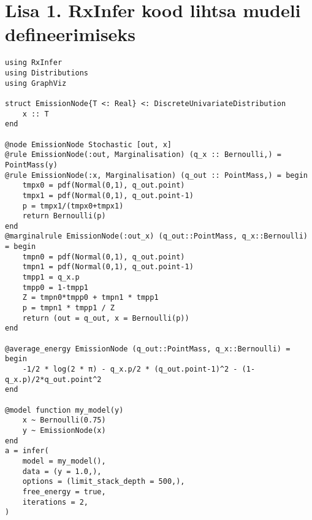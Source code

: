 \section*{Lisa 1. RxInfer kood lihtsa mudeli defineerimiseks} 
\label{section:lisa1}

\begin{verbatim}
using RxInfer
using Distributions
using GraphViz

struct EmissionNode{T <: Real} <: DiscreteUnivariateDistribution
    x :: T
end

@node EmissionNode Stochastic [out, x]
@rule EmissionNode(:out, Marginalisation) (q_x :: Bernoulli,) = PointMass(y)
@rule EmissionNode(:x, Marginalisation) (q_out :: PointMass,) = begin
    tmpx0 = pdf(Normal(0,1), q_out.point)
    tmpx1 = pdf(Normal(0,1), q_out.point-1)
    p = tmpx1/(tmpx0+tmpx1)
    return Bernoulli(p)
end
@marginalrule EmissionNode(:out_x) (q_out::PointMass, q_x::Bernoulli) = begin
    tmpn0 = pdf(Normal(0,1), q_out.point)
    tmpn1 = pdf(Normal(0,1), q_out.point-1)
    tmpp1 = q_x.p
    tmpp0 = 1-tmpp1  
    Z = tmpn0*tmpp0 + tmpn1 * tmpp1
    p = tmpn1 * tmpp1 / Z
    return (out = q_out, x = Bernoulli(p))
end

@average_energy EmissionNode (q_out::PointMass, q_x::Bernoulli) = begin
    -1/2 * log(2 * π) - q_x.p/2 * (q_out.point-1)^2 - (1-q_x.p)/2*q_out.point^2
end

@model function my_model(y)
    x ~ Bernoulli(0.75)
    y ~ EmissionNode(x)
end
a = infer(
    model = my_model(),
    data = (y = 1.0,),
    options = (limit_stack_depth = 500,),
    free_energy = true,
    iterations = 2,    
)
\end{verbatim}